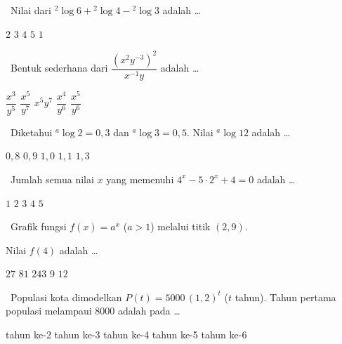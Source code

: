 \documentclass[11pt,a4paper]{exam}
\newcommand{\Inter}{{\footnotesize\textsf{\textcolor{biru}{[Intermediate]}}}\ }
\newcommand{\Adv}{{\footnotesize\textsf{\textcolor{oranye}{[Advanced]}}}\ }
\begin{document}
\begin{questions}
\question \Inter Nilai dari ${}^{2}\!\log 6 + {}^{2}\!\log 4 - {}^{2}\!\log 3$ adalah \dots
\begin{choices}
\choice $2$ \CorrectChoice $3$ \choice $4$ \choice $5$ \choice $1$
\end{choices}

\question \Inter Bentuk sederhana dari $\dfrac{(x^{2}y^{-3})^{2}}{x^{-1}y}$ adalah \dots
\begin{choices}
\choice $\dfrac{x^{3}}{y^{5}}$ \CorrectChoice $\dfrac{x^{5}}{y^{7}}$
\choice $x^{5}y^{7}$ \choice $\dfrac{x^{4}}{y^{6}}$ \choice $\dfrac{x^{5}}{y^{6}}$
\end{choices}

\question \Inter Diketahui ${}^{a}\!\log 2 = 0{,}3$ dan ${}^{a}\!\log 3 = 0{,}5$.
Nilai ${}^{a}\!\log 12$ adalah \dots
\begin{choices}
\choice $0{,}8$ \choice $0{,}9$ \choice $1{,}0$ \CorrectChoice $1{,}1$ \choice $1{,}3$
\end{choices}

\question \Adv Jumlah semua nilai $x$ yang memenuhi $4^{x} - 5\cdot 2^{x} + 4 = 0$ adalah \dots
\begin{choices}
\choice $1$ \CorrectChoice $2$ \choice $3$ \choice $4$ \choice $5$
\end{choices}

\question \Adv Grafik fungsi $f(x) = a^{x}$ ($a>1$) melalui titik $(2,9)$.

\begin{center}
\end{center}

Nilai $f(4)$ adalah \dots
\begin{choices}
\choice $27$ \CorrectChoice $81$ \choice $243$ \choice $9$ \choice $12$
\end{choices}

\question \Adv Populasi kota dimodelkan $P(t) = 5000\,(1{,}2)^{t}$ ($t$ tahun).
Tahun pertama populasi melampaui 8000 adalah pada \dots
\begin{choices}
\choice tahun ke-2 \CorrectChoice tahun ke-3 \choice tahun ke-4
\choice tahun ke-5 \choice tahun ke-6
\end{choices}


\end{questions}
\end{document}
